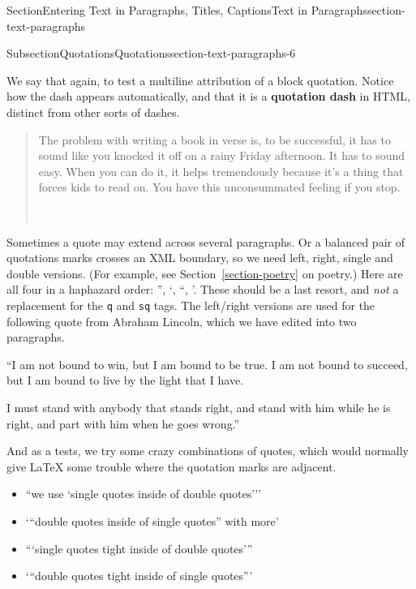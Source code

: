 \documentclass[twoside,10pt,]{article}
\newcommand{\xreffont}{\relax}
\newcommand{\mono}[1]{\texttt{#1}}
\newcommand{\terminology}[1]{\textbf{#1}}
\numberwithin{equation}{section}
\begin{document}
\begin{sectionptx}{Section}{Entering Text in Paragraphs, Titles, Captions}{}{Text in Paragraphs}{}{}{section-text-paragraphs}
\begin{subsectionptx}{Subsection}{Quotations}{}{Quotations}{}{}{section-text-paragraphs-6}
\begin{quote}
\end{quote}
We say that again, to test a multiline attribution of a block quotation.  Notice how the dash appears automatically, and that it is a \terminology{quotation dash} in HTML, distinct from other sorts of dashes.%
\begin{quote}%
The problem with writing a book in verse is, to be successful, it has to sound like you knocked it off on a rainy Friday afternoon. It has to sound easy. When you can do it, it helps tremendously because it's a thing that forces kids to read on. You have this unconsummated feeling if you stop.%
\nopagebreak\par%
\hfill{}\\\par
\end{quote}
Sometimes a quote may extend across several paragraphs.  Or a balanced pair of quotations marks crosses an XML boundary, so we need left, right, single and double versions.  (For example, see Section~\hyperref[section-poetry]{{\xreffont\ref{section-poetry}}} on poetry.)  Here are all four in a haphazard order: '', `, ``, '.  These should be a last resort, and \emph{not} a replacement for the \mono{q} and \mono{sq} tags.  The left\slash{}right versions are used for the following quote from Abraham Lincoln, which we have edited into two paragraphs.%
\par
``I am not bound to win, but I am bound to be true. I am not bound to succeed, but I am bound to live by the light that I have.%
\par
I must stand with anybody that stands right, and stand with him while he is right, and part with him when he goes wrong.''%
\par
And as a tests, we try some crazy combinations of quotes, which would normally give \LaTeX{} some trouble where the quotation marks are adjacent.%
\begin{itemize}[label=\textbullet]
\item{}``we use `single quotes inside of double quotes{'}''%
\item{}{`}``double quotes inside of single quotes'' with more'%
\item{}``{`}single quotes tight inside of double quotes{'}''%
\item{}{`}``double quotes tight inside of single quotes''{'}%

\end{itemize}
\end{subsectionptx}
\end{sectionptx}
\end{document}
